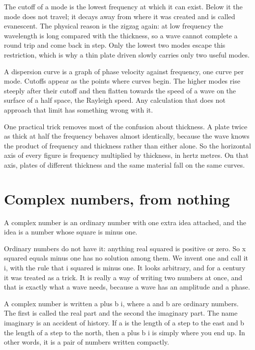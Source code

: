 \documentclass[11pt]{article}
\begin{document}
The cutoff of a mode is the lowest frequency at which it can exist. Below it the mode does not travel; it
decays away from where it was created and is called evanescent. The physical reason is the zigzag again: at
low frequency the wavelength is long compared with the thickness, so a wave cannot complete a round trip and
come back in step. Only the lowest two modes escape this restriction, which is why a thin plate driven slowly
carries only two useful modes.

A dispersion curve is a graph of phase velocity against frequency, one curve per mode. Cutoffs appear as the
points where curves begin. The higher modes rise steeply after their cutoff and then flatten towards the
speed of a wave on the surface of a half space, the Rayleigh speed. Any calculation that does not approach
that limit has something wrong with it.

One practical trick removes most of the confusion about thickness. A plate twice as thick at half the
frequency behaves almost identically, because the wave knows the product of frequency and thickness rather
than either alone. So the horizontal axis of every figure is frequency multiplied by thickness, in hertz
metres. On that axis, plates of different thickness and the same material fall on the same curves.

\section{Complex numbers, from nothing}

A complex number is an ordinary number with one extra idea attached, and the idea is a number whose square is
minus one.

Ordinary numbers do not have it: anything real squared is positive or zero. So x squared equals minus one has
no solution among them. We invent one and call it i, with the rule that i squared is minus one. It looks
arbitrary, and for a century it was treated as a trick. It is really a way of writing two numbers at once,
and that is exactly what a wave needs, because a wave has an amplitude and a phase.

A complex number is written a plus b i, where a and b are ordinary numbers. The first is called the real part
and the second the imaginary part. The name imaginary is an accident of history. If a is the length of a step
to the east and b the length of a step to the north, then a plus b i is simply where you end up. In other
words, it is a pair of numbers written compactly.
\end{document}
